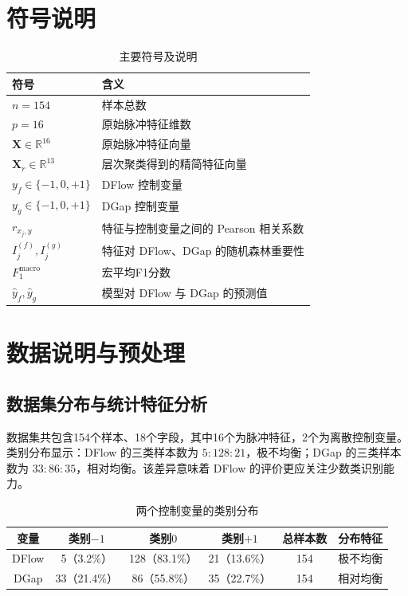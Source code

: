 \documentclass[UTF8,a4paper,12pt]{ctexart}
\begin{document}
\section{符号说明}

\begin{table}[H]
\centering
\caption{主要符号及说明}
\label{tab:symbols}
\begin{tabular}{>{\centering\arraybackslash}p{4.5cm}p{9.5cm}}
\toprule
符号 & 含义 \\
\midrule
$n=154$ & 样本总数 \\
$p=16$ & 原始脉冲特征维数 \\
$\bm{X}\in\mathbb{R}^{16}$ & 原始脉冲特征向量 \\
$\bm{X}_{r}\in\mathbb{R}^{13}$ & 层次聚类得到的精简特征向量 \\
$y_f\in\{-1,0,+1\}$ & DFlow 控制变量 \\
$y_g\in\{-1,0,+1\}$ & DGap 控制变量 \\
$r_{x_j,y}$ & 特征与控制变量之间的 Pearson 相关系数 \\
$I_j^{(f)},I_j^{(g)}$ & 特征对 DFlow、DGap 的随机森林重要性 \\
$F_1^{\text{macro}}$ & 宏平均F1分数 \\
$\hat y_f,\hat y_g$ & 模型对 DFlow 与 DGap 的预测值 \\
\bottomrule
\end{tabular}
\end{table}

\section{数据说明与预处理}

\subsection{数据集分布与统计特征分析}

数据集共包含154个样本、18个字段，其中16个为脉冲特征，2个为离散控制变量。类别分布显示：DFlow 的三类样本数为 $5:128:21$，极不均衡；DGap 的三类样本数为 $33:86:35$，相对均衡。该差异意味着 DFlow 的评价更应关注少数类识别能力。

\begin{table}[H]
\centering
\caption{两个控制变量的类别分布}
\label{tab:dist}
\begin{tabular}{cccccc}
\toprule
变量 & 类别$-1$ & 类别$0$ & 类别$+1$ & 总样本数 & 分布特征 \\
\midrule
DFlow & 5（3.2\%） & 128（83.1\%） & 21（13.6\%） & 154 & 极不均衡 \\
DGap  & 33（21.4\%） & 86（55.8\%） & 35（22.7\%） & 154 & 相对均衡 \\
\bottomrule
\end{tabular}
\end{table}
\end{document}
